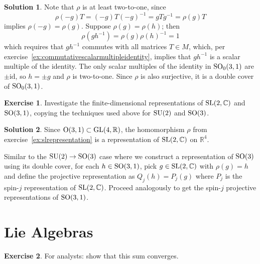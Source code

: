 \documentclass[11pt, a4paper]{report}
\theoremstyle{definition}
\newtheorem{ex}{Exercise}[part]
\newtheorem{sol}{Solution}[part]
\newcommand*{\GL}{\ensuremath\text{GL}}
\newcommand*{\SL}{\ensuremath\text{SL}}
\renewcommand*{\O}{\ensuremath\text{O}}
\newcommand*{\SO}{\ensuremath\text{SO}}
\newcommand*{\SU}{\ensuremath\text{SU}}
\begin{document}
\begin{sol}

Note that $\rho$ is at least two-to-one, since
\[
    \rho(-g)T = (-g) T {(-g)}^{-1} = gTg^{-1} = \rho(g) T
\]
implies $\rho(-g) = \rho(g)$. Suppose $\rho(g) = \rho(h)$; then
\[
    \rho(gh^{-1}) = \rho(g) {\rho(h)}^{-1} = 1
\]
which requires that $gh^{-1}$ commutes with all matrices $T \in M$, which, per exercise~\ref{ex:commutativescalarmultipleidentity}, implies that $gh^{-1}$ is a scalar multiple of the identity.
The only scalar multiples of the identity in $\SO_0(3, 1)$ are $\pm \text{id}$, so $h = \pm g$ and $\rho$ is two-to-one.
Since $\rho$ is also surjective, it is a double cover of $\SO_0(3, 1)$.

\end{sol}

\begin{ex}

Investigate the finite-dimensional representations of $\SL(2, \mathbb{C})$ and $\SO(3, 1)$, copying the techniques used above for $\SU(2)$ and $\SO(3)$.

\end{ex}

\begin{sol}

Since $\O(3, 1) \subset \GL(4, \mathbb{R})$, the homomorphism $\rho$ from exercise~\ref{ex:slrepresentation} is a representation of $\SL(2, \mathbb{C})$ on $\mathbb{R}^4$.

Similar to the $\SU(2) \to \SO(3)$ case where we construct a representation of $\SO(3)$ using its double cover, for each $h \in \SO(3, 1)$, pick $g \in \SL(2, \mathbb{C})$ with $\rho(g) = h$ and define the projective representation as $Q_j(h) = P_j(g)$ where $P_j$ is the spin-$j$ representation of $\SL(2, \mathbb{C})$.
Proceed analogously to get the spin-$j$ projective representations of $\SO(3, 1)$.

\end{sol}

\section{Lie Algebras}

\begin{ex}

For analysts: show that this sum converges.

\end{ex}
\end{document}
